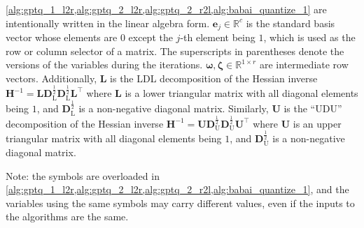 \documentclass{article} %
\begin{document}
\cref{alg:gptq_1_l2r,alg:gptq_2_l2r,alg:gptq_2_r2l,alg:babai_quantize_1} are intentionally written in the linear algebra form.
$\mathbf{e}_{j} \in \mathbb{R}^{c}$ is the standard basis vector whose elements are $0$ except the $j$-th element being $1$, which is used as the row or column selector of a matrix.
The superscripts in parentheses denote the versions of the variables during the iterations.
$\bm{\omega}, \bm{\zeta} \in \mathbb{R}^{1 \times r}$ are intermediate row vectors.
Additionally, $\bm{L}$ is the LDL decomposition of the Hessian inverse $\bm{H}^{-1} = \bm{L} \bm{D}_{\mathrm{L}}^{\frac{1}{2}} \bm{D}_{\mathrm{L}}^{\frac{1}{2}} \bm{L}^\top$ where $\bm{L}$ is a lower triangular matrix with all diagonal elements being $1$, and $\bm{D}_{\mathrm{L}}^{\frac{1}{2}}$ is a non-negative diagonal matrix.
Similarly, $\bm{U}$ is the ``UDU'' decomposition of the Hessian inverse $\bm{H}^{-1} = \bm{U} \bm{D}_{\mathrm{U}}^{\frac{1}{2}} \bm{D}_{\mathrm{U}}^{\frac{1}{2}} \bm{U}^\top$ where $\bm{U}$ is an upper triangular matrix with all diagonal elements being $1$, and $\bm{D}_{\mathrm{U}}^{\frac{1}{2}}$ is a non-negative diagonal matrix.

Note: the symbols are overloaded in \cref{alg:gptq_1_l2r,alg:gptq_2_l2r,alg:gptq_2_r2l,alg:babai_quantize_1}, and the variables using the same symbols may carry different values, even if the inputs to the algorithms are the same.
\end{document}
